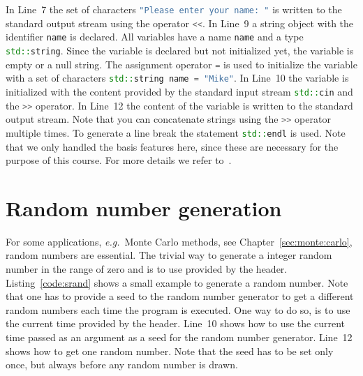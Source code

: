 In Line~7 the set of characters \lstinline[language=c++]{"Please enter your name: "} is written to the standard output stream using the operator \lstinline[language=c++]{<<}. In Line~9 a string object with the identifier \lstinline[language=c++]{name} is declared. All variables have a name \lstinline[language=c++]{name} and a type  \lstinline[language=c++]{std::string}. Since the variable is declared but not initialized yet, the variable is empty or a null string. The assignment operator \lstinline[language=c++]{=} is used to initialize the variable with a set of characters  \lstinline[language=c++]{std::string name = "Mike"}. In Line~10 the variable is initialized with the content provided by the standard input stream \lstinline[language=c++]{std::cin} and the \lstinline[language=c++]{>>} operator. In Line~12 the content of the variable is written to the standard output stream. Note that you can concatenate strings using the \lstinline[language=c++]{>>} operator multiple times. To generate a line break the statement \lstinline[language=c++]{std::endl} is used. Note that we only handled the basis features here, since these are necessary for the purpose of this course. For more details we refer to~\cite[Chapter~1]{andrew2000accelerated}.





\section{Random number generation}
\label{sec:random:numbers}
For some applications, \emph{e.g.}\ Monte Carlo methods, see Chapter~\ref{sec:monte:carlo}, random numbers are essential. The trivial way to generate a integer random number in the range of zero and  is to use  provided by the  header. Listing~\ref{code:srand} shows a small example to generate a random number. Note that one has to provide a seed to the random number generator to get a different random numbers each time the program is executed. One way to do so, is to use the current time  provided by the  header. Line~10 shows how to use the current time passed as an argument  as a seed for the random number generator. Line~\mbox{12} shows how to get one random number. Note that the seed has to be set only once, but always before any random number is drawn.\\

